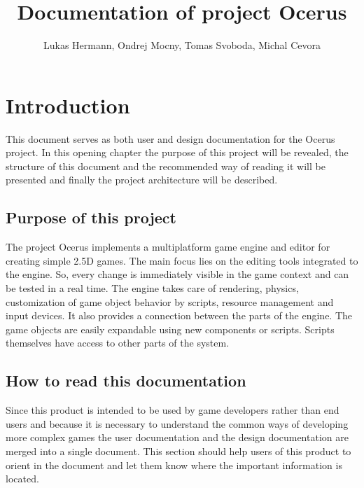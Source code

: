 \documentclass[a4paper, 12pt]{report}
\begin{document}
\pagestyle{empty} %

\title{Documentation of project Ocerus}
\author{Lukas Hermann, Ondrej Mocny, Tomas Svoboda, Michal Cevora}
\maketitle

\pagestyle{plain} %

\tableofcontents %
\cleardoublepage %

\chapter{Introduction}

This document serves as both user and design documentation for the Ocerus project. In this opening chapter the purpose of this project will be revealed, the structure of this document and the recommended way of reading it will be presented and finally the project architecture will be described.

\section{Purpose of this project}

The project Ocerus implements a multiplatform game engine and editor for creating simple 2.5D games. The main focus lies on the editing tools integrated to the engine. So, every change is immediately visible in the game context and can be tested in a real time. The engine takes care of rendering, physics, customization of game object behavior by scripts, resource management and input devices. It also provides a connection between the parts of the engine. The game objects are easily expandable using new components or scripts. Scripts themselves have access to other parts of the system.

\section{How to read this documentation}

Since this product is intended to be used by game developers rather than end users and because it is necessary to understand the common ways of developing more complex games the user documentation and the design documentation are merged into a single document. This section should help users of this product to orient in the document and let them know where the important information is located.
\end{document}
